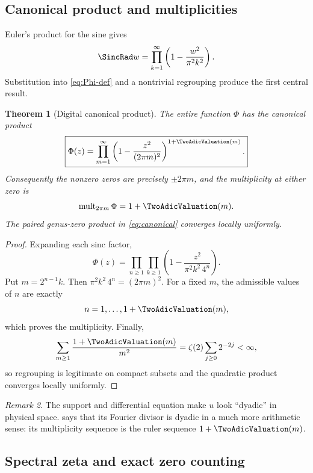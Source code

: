 \documentclass[11pt,oneside]{article}
\newtheorem{theorem}{Theorem}[section]
\theoremstyle{definition}
\theoremstyle{remark}
\newtheorem{remark}[theorem]{Remark}
\begin{document}
\subsection{Canonical product and multiplicities}

Euler's product for the sine gives
\[
 \SincRad w=\prod_{k=1}^{\infty}\left(1-\frac{w^2}{\pi^2k^2}\right).
\]
Substitution into \eqref{eq:Phi-def} and a nontrivial regrouping produce the
first central result.

\begin{theorem}[Digital canonical product]
\label{thm:canonical}
The entire function \(\Phi\) has the canonical product
\begin{equation}
 \boxed{\displaystyle
 \Phi(z)=
 \prod_{m=1}^{\infty}
 \left(1-\frac{z^2}{(2\pi m)^2}\right)^{1+\TwoAdicValuation(m)}.}
 \label{eq:canonical}
\end{equation}
Consequently the nonzero zeros are precisely \(\pm2\pi m\), and the
multiplicity at either zero is
\begin{equation}
 \operatorname{mult}_{2\pi m}\Phi=1+\TwoAdicValuation(m).
 \label{eq:multiplicity}
\end{equation}
The paired genus-zero product in \eqref{eq:canonical} converges locally
uniformly.
\end{theorem}

\begin{proof}
Expanding each sinc factor,
\[
 \Phi(z)=
 \prod_{n\geq1}\prod_{k\geq1}
 \left(1-\frac{z^2}{\pi^2k^2\,4^n}\right).
\]
Put \(m=2^{n-1}k\).  Then
\(\pi^2k^2\,4^n=(2\pi m)^2\).  For a fixed \(m\), the admissible values of
\(n\) are exactly
\[
 n=1,\ldots,1+\TwoAdicValuation(m),
\]
which proves the multiplicity.  Finally,
\[
 \sum_{m\geq1}\frac{1+\TwoAdicValuation(m)}{m^2}
 =\zeta(2)\sum_{j\geq0}2^{-2j}<\infty,
\]
so regrouping is legitimate on compact subsets and the quadratic product
converges locally uniformly.
\end{proof}

\begin{remark}
The support and differential equation make \(u\) look ``dyadic'' in physical
space.   says that its Fourier divisor is dyadic in a much
more arithmetic sense: its multiplicity sequence is the ruler sequence
\(1+\TwoAdicValuation(m)\).
\end{remark}

\subsection{Spectral zeta and exact zero counting}
\end{document}
